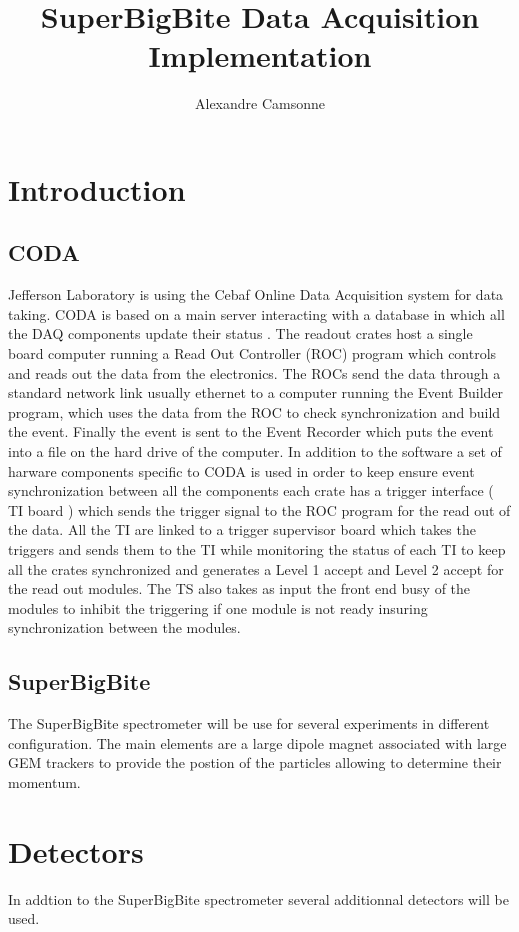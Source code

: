 \documentclass{article}
\title {SuperBigBite Data Acquisition Implementation}
\author{Alexandre Camsonne}
\begin{document}
\section{Introduction}
\subsection{CODA}
Jefferson Laboratory is using the Cebaf Online Data Acquisition system for data taking.
CODA is based on a main server interacting with a database in which all the DAQ components update their status . The readout crates host a single board computer running a Read Out Controller (ROC) program which controls and reads out the data from the electronics. The ROCs send the data through a standard network link usually ethernet to a computer running the Event Builder program, which uses the data from the ROC to check synchronization and build the event. Finally the event is sent to the Event Recorder which puts the event into a file on the hard drive of the computer.
In addition to the software a set of harware components specific to CODA is used in order to keep ensure event synchronization between all the components each crate has a trigger interface ( TI board ) which sends the trigger signal to the ROC program for the read out of the data. All the TI are linked to a trigger supervisor board which takes the triggers and sends them to the TI while monitoring the status of each TI to keep all the crates synchronized and generates a Level 1 accept and Level 2 accept for the read out modules. The TS also takes as input the front end busy of the modules to inhibit the triggering if one module is not ready insuring synchronization between the modules.


\subsection{SuperBigBite}
The SuperBigBite spectrometer will be use for several experiments in different configuration. The main elements are a large dipole magnet associated with large GEM trackers to provide the postion of the particles allowing to determine their momentum.
\section{Detectors}
In addtion to the SuperBigBite spectrometer several additionnal detectors will be used.
\end{document}
